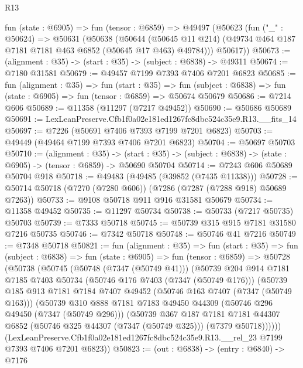 \begin{lexlean}{R13}
\begin{coremodule}
  fun (state : @6905) =>
  fun (tensor : @6859) =>
  @49497
    (@50623
      (fun ("_" : @50624) =>
      @50631
        (@50638
          (@50644
            (@50645 @11 @214)
            (@49734 @464 @187 @7181 @7181 @463 @6852 (@50645 @17 @463) @49784)))
        @50617))
@50673 := (alignment : @35) -> (start : @35) -> (subject : @6838) -> @49311
@50674 := @7180 @31581
@50679 := @49457 @7199 @7393 @7406 @7201 @6823
@50685 := fun (alignment : @35) =>
  fun (start : @35) =>
  fun (subject : @6838) => fun (state : @6905) => fun (tensor : @6859) => @50674 @50679
@50686 := @7214 @606
@50689 := @11358 (@11297 (@7217 @49452))
@50690 := @50686 @50689
@50691 := LexLeanPreserve.Cfb1f0a02e181ed1267fc8dbc524c35e9.R13.__fits_14
@50697 := @7226 (@50691 @7406 @7393 @7199 @7201 @6823)
@50703 := @49449 (@49464 @7199 @7393 @7406 @7201 @6823)
@50704 := @50697 @50703
@50710 := (alignment : @35) ->
  (start : @35) -> (subject : @6838) -> (state : @6905) -> (tensor : @6859) -> @50690 @50704
@50714 := @7243 @606 @50689 @50704 @918
@50718 := @49483 (@49485 (@39852 (@7435 @11338)))
@50728 := @50714 @50718 (@7270 (@7280 @606)) (@7286 (@7287 (@7288 @918) @50689 @7263))
@50733 := @9108 @50718 @911 @916 @31581 @50679
@50734 := @11358 @49452
@50735 := @11297 @50734
@50738 := @50733 (@7217 @50735) @50703
@50739 := @7333 @50718
@50745 := @50739 @315 @915 @7181 @31580 @7216 @50735
@50746 := @7342 @50718
@50748 := @50746 @41 @7216
@50749 := @7348 @50718
@50821 := fun (alignment : @35) =>
  fun (start : @35) =>
  fun (subject : @6838) =>
  fun (state : @6905) =>
  fun (tensor : @6859) =>
  @50728
    (@50738
      (@50745
        (@50748 (@7347 (@50749 @41)))
        (@50739
          @204
          @914
          @7181
          @7185
          @7403
          @50734
          (@50746 @176 @7403 (@7347 (@50749 @176)))
          (@50739
            @185
            @913
            @7181
            @7184
            @7407
            @49452
            (@50746 @163 @7407 (@7347 (@50749 @163)))
            (@50739
              @310
              @888
              @7181
              @7183
              @49450
              @44309
              (@50746 @296 @49450 (@7347 (@50749 @296)))
              (@50739
                @367
                @187
                @7181
                @7181
                @44307
                @6852
                (@50746 @325 @44307 (@7347 (@50749 @325)))
                (@7379 @50718))))))
      (LexLeanPreserve.Cfb1f0a02e181ed1267fc8dbc524c35e9.R13.__rel_23
        @7199
        @7393
        @7406
        @7201
        @6823))
@50823 := (out : @6838) -> (entry : @6840) -> @7176

\end{coremodule}
\end{lexlean}
